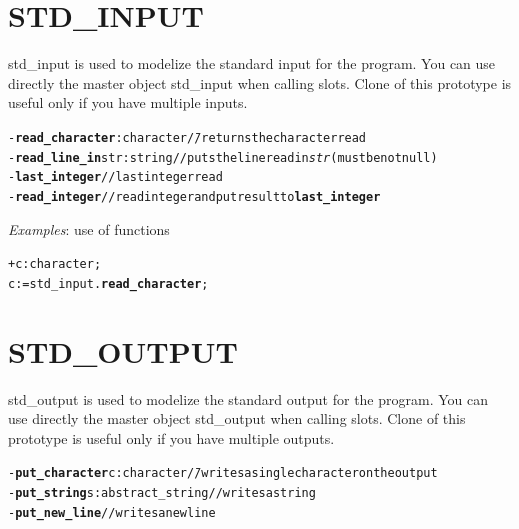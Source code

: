 \documentclass[11pt]{mybook}
\begin{document}
\section{STD\_INPUT}
\label{library:std_input}
%
{\sc{}std\_input} is used to modelize the standard input for the program. You can use directly the master object {\sc{}std\_input} when calling slots. Clone of this prototype is useful only if you have multiple inputs.
\begin{alltt}
\begin{tabbing}
  - {\bf{}read\_character}:{\sc{}character}   \= // returns the character read \\
  - {\bf{}read\_line\_in} str:{\sc{}string}   \> // puts the line read in {\it{}str} (must be not {\sc{}null})\\
  - {\bf{}last\_integer}                      \> // last integer read\\
  - {\bf{}read\_integer}                      \> // read integer and put result to {\bf{}last\_integer}\\
\end{tabbing}
\end{alltt}

{\it{}Examples}: use of functions
\begin{alltt}
  + c:{\sc{}character};
  c := {\sc{}std\_input}.{\bf{}read\_character};
\end{alltt}
\section{STD\_OUTPUT}
\label{library:std_output}
%
{\sc{}std\_output} is used to modelize the standard output for the program. You can use directly the master object {\sc{}std\_output} when calling slots. Clone of this prototype is useful only if you have multiple outputs.
\begin{alltt}
\begin{tabbing}
  - {\bf{}put\_character} c:{\sc{}character}    \= // writes a single character on the output \\
  - {\bf{}put\_string} s:{\sc{}abstract\_string}        \> // writes a string \\
  - {\bf{}put\_new\_line}                               \> // writes a new line \\
\end{tabbing}
\end{alltt}
\end{document}
